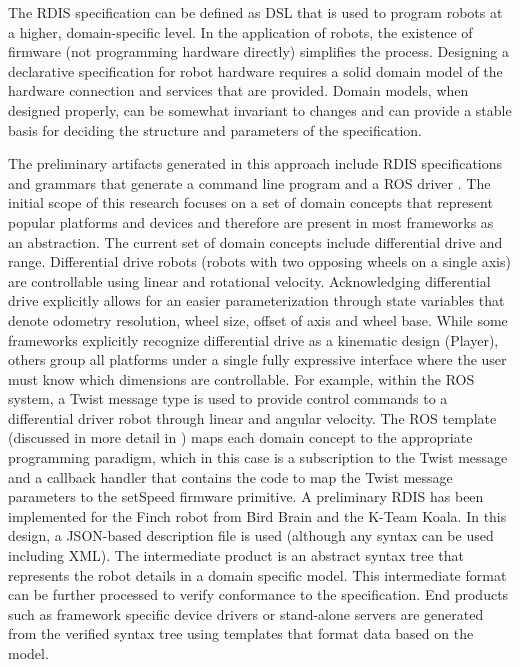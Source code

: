 The RDIS specification can be defined as DSL that is used to program robots at a higher, domain-specific level.  In the application of robots, the existence of firmware (not programming hardware directly) simplifies the process.  Designing a declarative specification for robot hardware requires a solid domain model of the hardware connection and services that are provided.  Domain models, when designed properly, can be somewhat invariant to changes and can provide a stable basis for deciding the structure and parameters of the specification.  %

The preliminary artifacts generated in this approach include RDIS specifications and grammars that generate a command line program and a ROS driver \cite{Anderson2012}.  The initial scope of this research focuses on a set of domain concepts that represent popular platforms and devices and therefore are present in most frameworks as an abstraction.   The current set of domain concepts include {\sc differential drive} and {\sc range}.   Differential drive robots (robots with two opposing wheels on a single axis) are controllable using linear and rotational velocity.   Acknowledging differential drive explicitly allows for an easier parameterization through state variables that denote odometry resolution, wheel size, offset of axis and wheel base.  While some frameworks explicitly recognize differential drive as a kinematic design (Player), others group all platforms under a single fully expressive interface where the user must know which dimensions are controllable.  For example, within the ROS system, a {\sc Twist} message type is used to provide control commands to a differential driver robot through linear and angular velocity.  The ROS template (discussed in more detail in \cite{Anderson2012}) maps each domain concept to the appropriate programming paradigm, which in this case is a subscription to the {\sc Twist} message and a callback handler that contains the code to map the {\sc Twist} message parameters to the {\sc setSpeed} firmware primitive.   A preliminary RDIS has been implemented for the Finch robot from Bird Brain and the K-Team Koala\cite{Anderson2012}.  In this design, a JSON-based description file is used (although any syntax can be used including XML).  The intermediate product is an abstract syntax tree that represents the robot details in a domain specific model.  This intermediate format can be further processed to verify conformance to the specification.  End products such as framework specific device drivers or stand-alone servers are generated from the verified syntax tree using templates that format data based on the model. 


